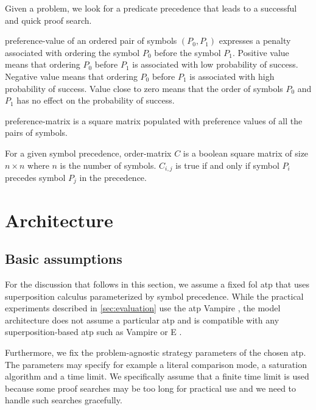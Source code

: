 Given a problem, we look for a predicate \gls{precedence} that leads to a successful and quick proof search.

\Gls{preference-value} of an ordered pair of symbols \((P_0, P_1)\) expresses a penalty associated with ordering the symbol \(P_0\) before the symbol \(P_1\).
Positive value means that ordering \(P_0\) before \(P_1\) is associated with low probability of success.
Negative value means that ordering \(P_0\) before \(P_1\) is associated with high probability of success.
Value close to zero means that the order of symbols \(P_0\) and \(P_1\) has no effect on the probability of success.

\Gls{preference-matrix} is a square matrix populated with preference values of all the pairs of symbols.

For a given symbol precedence,
\gls{order-matrix} \(C\) is a boolean square matrix of size \(n \times n\) where \(n\) is the number of symbols.
\(C_{i, j}\) is true if and only if symbol \(P_i\) precedes symbol \(P_j\) in the precedence.


\section{Architecture}

\subsection{Basic assumptions}

For the discussion that follows in this section,
we assume a fixed \gls{fol} \gls{atp} that uses superposition calculus parameterized by symbol precedence.
While the practical experiments described in \autoref{sec:evaluation} use the \gls{atp} Vampire \cite{Kovacs2013},
the model architecture does not assume a particular \gls{atp}
and is compatible with any superposition-based \gls{atp} such as Vampire or E \cite{SCV:CADE-2019}. 

Furthermore, we fix the problem-agnostic strategy parameters of the chosen \gls{atp}.
The parameters may specify for example a literal comparison mode, a saturation algorithm
and a time limit.
We specifically assume that a finite time limit is used
because some proof searches may be too long for practical use\cite{?}
and we need to handle such searches gracefully.


